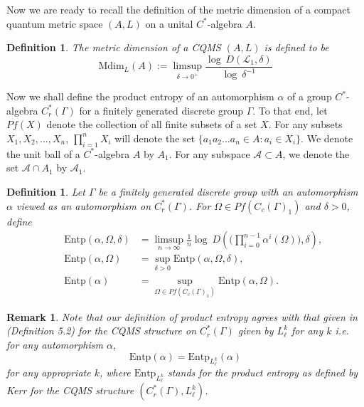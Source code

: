 \documentclass[a4paper,11pt,reqno]{amsart}
\theoremstyle{plain}
\newtheorem{defn}[thm]{Definition}
\newtheorem{rem}[thm]{Remark}
\theoremstyle{mainthmstyle}
\theoremstyle{named}
\numberwithin{equation}{section}
\begin{document}
Now we are ready to recall the definition of the metric dimension of a compact quantum metric space $(A,L)$ on a unital $C^{\ast}$-algebra $A$.
\begin{defn}
    The metric dimension of a CQMS $(A,L)$ is defined to be
    \begin{displaymath}
        \mathrm{Mdim}_{L}(A):=\limsup\limits_{\delta\to 0^{+}} \frac{\log \ D(\mathcal{L}_{1},\delta)}{\log \ \delta^{-1}}
    \end{displaymath}
\end{defn}
Now we shall define the product entropy of an automorphism $\alpha$ of a group $C^{\ast}$-algebra $C^{\ast}_{r}(\Gamma)$ for a finitely generated discrete group $\Gamma$. To that end, let $Pf(X)$ denote the collection of all finite subsets of a set $X$. For any subsets $X_{1},X_{2},\ldots,X_{n}$, $\prod\limits_{i=1}^{n} X_{i}$ will denote the set $\{a_{1}a_{2}\ldots a_{n}\in A:a_{i}\in X_{i}\}$. We denote the unit ball of a $C^{\ast}$-algebra $A$ by $A_{1}$. For any subspace $\mathcal{A}\subset A$, we denote the set $\mathcal{A}\cap A_{1}$ by $\mathcal{A}_1$.
\begin{defn}
    Let $\Gamma$ be a finitely generated discrete group with an automorphism $\alpha$ viewed as an automorphism on $C^{\ast}_{r}(\Gamma)$. For $\Omega\in Pf(C_{c}(\Gamma)_{1})$ and $\delta>0$, define
    \begin{align*}
        &&\mathrm{Entp} (\alpha,\Omega,\delta) & =  \limsup\limits_{n\to\infty}\frac{1}{n}\log \ D \left (\Big(\prod_{i=0}^{n-1}\alpha^{i}(\Omega)\Big),\delta \right ),\\
        &&\mathrm{Entp}(\alpha,\Omega) & = \sup_{\delta>0}\mathrm{Entp}(\alpha,\Omega,\delta),\\
        &&\mathrm{Entp}(\alpha) & =  \sup_{\Omega\in Pf(C_{c}(\Gamma)_1)}\mathrm{Entp}(\alpha,\Omega).
    \end{align*}
\end{defn}
\begin{rem}\label{Kerrcomparison}
    Note that our definition of product entropy agrees with that given in \cite{Kerr}(Definition 5.2) for the CQMS structure on $C^{\ast}_{r}(\Gamma)$ given by $L_{\ell}^{k}$ for any $k$ i.e. for any automorphism $\alpha$, 
    \begin{displaymath}
        \mathrm{Entp}(\alpha)=\mathrm{Entp}_{L^{k}_{\ell}}(\alpha)
    \end{displaymath}
    for any appropriate $k$, where $\mathrm{Entp}_{L_{\ell}^k}$ stands for the product entropy as defined by Kerr for the CQMS structure $(C^{\ast}_{r}(\Gamma),L_{\ell}^{k})$. 
\end{rem}
\end{document}
